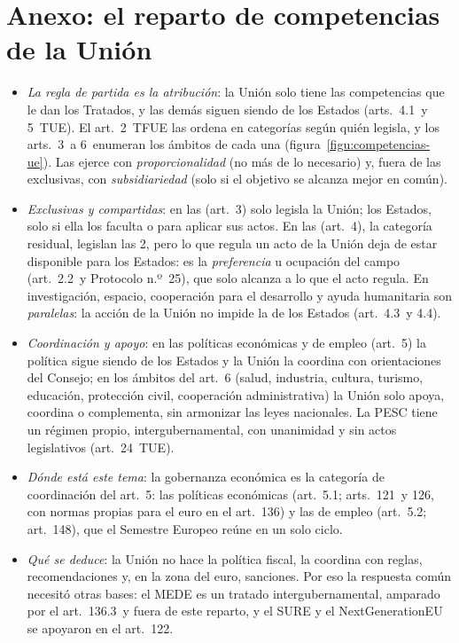 \documentclass[11pt]{article}
\begin{document}
\section{Anexo: el reparto de competencias\cortetitulo{} de la Unión}\label{anexo:competencias}

\begin{itemize}
\item \emph{La regla de partida es la atribución}: la Unión solo tiene las competencias que le dan los Tratados, y las demás siguen siendo de los Estados (arts.~4.1~y 5~TUE). El art.~2~TFUE las ordena en categorías según quién legisla, y los arts.~3~a 6~enumeran los ámbitos de cada una (figura~\ref{figu:competencias-ue}). Las ejerce con \emph{proporcionalidad} (no más de lo necesario) y, fuera de las exclusivas, con \emph{subsidiariedad} (solo si el objetivo se alcanza mejor en común).
\item \emph{Exclusivas y compartidas}: en las  (art.~3) solo legisla la Unión; los Estados, solo si ella los faculta o para aplicar sus actos. En las  (art.~4), la categoría residual, legislan las 2, pero lo que regula un acto de la Unión deja de estar disponible para los Estados: es la \emph{preferencia} u ocupación del campo (art.~2.2~y Protocolo n.º~25), que solo alcanza a lo que el acto regula. En investigación, espacio, cooperación para el desarrollo y ayuda humanitaria son \emph{paralelas}: la acción de la Unión no impide la de los Estados (art.~4.3~y 4.4).
\item \emph{Coordinación y apoyo}: en las políticas económicas y de empleo (art.~5) la política sigue siendo de los Estados y la Unión la coordina con orientaciones del Consejo; en los ámbitos del art.~6 (salud, industria, cultura, turismo, educación, protección civil, cooperación administrativa) la Unión solo apoya, coordina o complementa, sin armonizar las leyes nacionales. La PESC tiene un régimen propio, intergubernamental, con unanimidad y sin actos legislativos (art.~24~TUE).
\item \emph{Dónde está este tema}: la gobernanza económica es la categoría de coordinación del art.~5: las políticas económicas (art.~5.1; arts.~121~y 126, con normas propias para el euro en el art.~136) y las de empleo (art.~5.2; art.~148), que el Semestre Europeo reúne en un solo ciclo.
\item \emph{Qué se deduce}: la Unión no hace la política fiscal, la coordina con reglas, recomendaciones y, en la zona del euro, sanciones. Por eso la respuesta común necesitó otras bases: el MEDE es un tratado intergubernamental, amparado por el art.~136.3~y fuera de este reparto, y el SURE y el NextGenerationEU se apoyaron en el art.~122.
\end{itemize}
\end{document}
